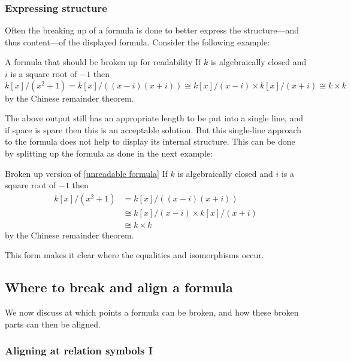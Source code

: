 \subsubsection{Expressing structure}

Often the breaking up of a formula is done to better express the structure---and thus content---of the displayed formula.
Consider the following example:
\begin{showlatex}[label={unreadable formula}]{A formula that should be broken up for readability}
If $k$ is algebraically closed and $i$ is a square root of $-1$ then
\[
  k[x]/(x^2 + 1)
  =
  k[x]/( (x - i) (x + i) )
  \cong
  k[x]/(x - i) \times k[x]/(x + i)
  \cong
  k \times k
\]
by the Chinese remainder theorem.
\end{showlatex}
The above output still has an appropriate length to be put into a single line, and if space is spare then this is an acceptable solution.
But this single-line approach to the formula does not help to display its internal structure.
This can be done by splitting up the formula as done in the next example:
\begin{showlatex}{Broken up version of \cref*{unreadable formula}}
If $k$ is algebraically closed and $i$ is a square root of $-1$ then
\begin{align*}
  k[x]/(x^2 + 1)
  &=
  k[x]/( (x - i) (x + i) )
  \\
  &\cong
  k[x]/(x - i) \times k[x]/(x + i)
  \\
  &\cong
  k \times k
\end{align*}
by the Chinese remainder theorem.
\end{showlatex}
This form makes it clear where the equalities and isomorphisms occur.



\subsection{Where to break and align a formula}

We now discuss at which points a formula can be broken, and how these broken parts can then be aligned.

\subsubsection{Aligning at relation symbols I}

